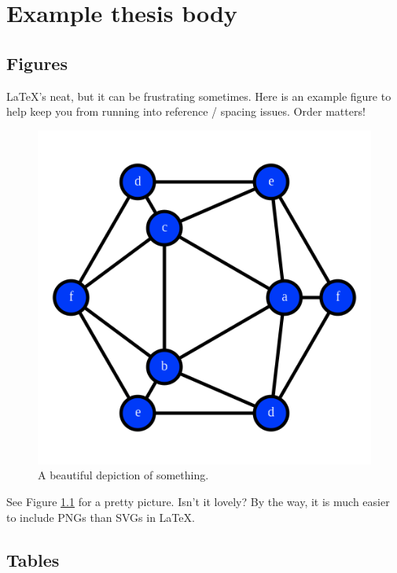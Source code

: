 
\chapter{Example thesis body}

  \section{Figures}

    LaTeX's neat, but it can be frustrating sometimes. Here is an example figure to help keep you from running into reference / spacing issues. Order matters!

    \begin{figure}
      \centering
      \includegraphics[scale=0.35]{res/images/pretty_picture.png}
      \caption{A beautiful depiction of something.}
      \label{fig:pretty_picture}
    \end{figure}

    See Figure \ref{fig:pretty_picture} for a pretty picture. Isn't it lovely? By the way, it is much easier to include PNGs than SVGs in LaTeX. 


  \section{Tables}

